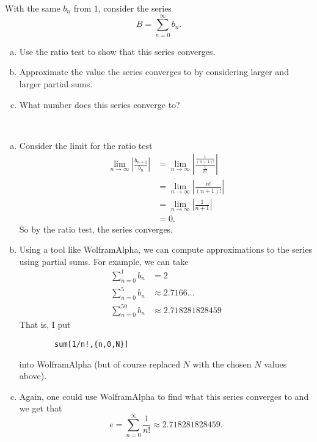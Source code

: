 \documentclass[12pt]{article} %
\begin{document}
\newpage
\begin{problem}
With the same $b_n$ from $1$, consider the series
\[
B = \sum_{n=0}^\infty b_n.
\]
\begin{enumerate}[(a)]
    \item Use the ratio test to show that this series converges.
    \item Approximate the value the series converges to by considering larger and larger partial sums.
    \item What number does this series converge to?
\end{enumerate}
\end{problem}
\begin{solution}~
\begin{enumerate}[(a)]
    \item Consider the limit for the ratio test
    \begin{align*}
        \lim_{n\to \infty} \left| \frac{b_{n+1}}{b_n} \right|&= \lim_{n\to \infty} \left| \frac{\frac{1}{(n+1)!}}{\frac{1}{n!}}\right|\\
        &= \lim_{n\to \infty} \left| \frac{n!}{(n+1)!}\right|\\
        &= \lim_{n\to \infty} \left| \frac{1}{n+1}\right|\\
        &=0.
    \end{align*}
    So by the ratio test, the series converges.
    \item Using a tool like WolframAlpha, we can compute approximations to the series using partial sums. For example, we can take 
    \begin{align*}
        \sum_{n=0}^1 b_n &= 2\\
        \sum_{n=0}^5 b_n &\approx 2.7166...\\
        \sum_{n=0}^{50} b_n &\approx 2.718281828459
    \end{align*}
    That is, I put
    \begin{verbatim}
        sum[1/n!,{n,0,N}]
    \end{verbatim}
    into WolframAlpha (but of course replaced $N$ with the chosen $N$ values above).
    \item Again, one could use WolframAlpha to find what this series converges to and we get that
    \[
    e=\sum_{n=0}^\infty \frac{1}{n!} \approx 2.718281828459.
    \]
\end{enumerate}
\end{solution}
\end{document}
